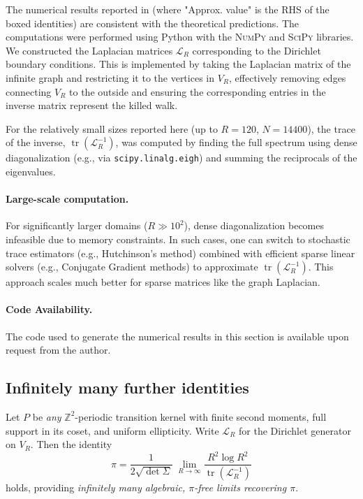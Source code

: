 \documentclass{article}
\numberwithin{equation}{section}
\theoremstyle{definition}
\theoremstyle{remark}
\DeclareMathOperator{\tr}{tr}
\begin{document}
The numerical results reported in  (where "Approx. value" is the RHS of the boxed identities) are consistent with the theoretical predictions. The computations were performed using Python with the \textsc{NumPy} and \textsc{SciPy} libraries.
We constructed the Laplacian matrices $\mathcal{L}_R$ corresponding to the Dirichlet boundary conditions. This is implemented by taking the Laplacian matrix of the infinite graph and restricting it to the vertices in $V_R$, effectively removing edges connecting $V_R$ to the outside and ensuring the corresponding entries in the inverse matrix represent the killed walk.

For the relatively small sizes reported here (up to $R=120$, $N=14400$), the trace of the inverse, $\tr(\mathcal{L}_R^{-1})$, was computed by finding the full spectrum using dense diagonalization (e.g., via \texttt{scipy.linalg.eigh}) and summing the reciprocals of the eigenvalues.

\paragraph{Large-scale computation.} For significantly larger domains ($R \gg 10^2$), dense diagonalization becomes infeasible due to memory constraints. In such cases, one can switch to stochastic trace estimators (e.g., Hutchinson's method) combined with efficient sparse linear solvers (e.g., Conjugate Gradient methods) to approximate $\tr(\mathcal{L}_R^{-1})$. This approach scales much better for sparse matrices like the graph Laplacian.

\paragraph{Code Availability.} The code used to generate the numerical results in this section is available upon request from the author.


\subsection{Infinitely many further identities}\label{app:infinite}

Let \(P\) be \emph{any} $\mathbb{Z}^{2}$-periodic transition kernel
with finite second moments, full support in its coset, and
uniform ellipticity.
Write \( \mathcal{L}_R \) for the Dirichlet generator on \( V_R \).
Then the identity
\[\pi=\frac{1}{2\sqrt{\det\Sigma}}\;\lim_{R\to\infty}\frac{R^{2}\log R^{2}}{\tr(\mathcal{L}_R^{-1})}\]
holds, providing
\emph{infinitely many algebraic, $\pi$-free limits recovering $\pi$}.
\end{document}
